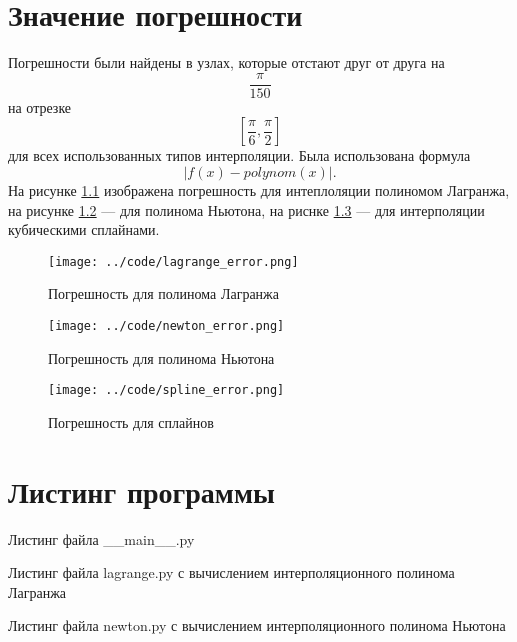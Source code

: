 \chapter{Значение погрешности}

Погрешности были найдены в узлах, которые отстают друг от друга на
$$ \frac{ \pi }{150}$$
на отрезке
$$ \left[ \frac{ \pi }{6}, \frac{ \pi }{2} \right] $$
для всех использованных типов интерполяции.
Была использована формула
$$ \left| f \left( x \right) - polynom \left( x \right) \right|.$$
На рисунке \ref{fig:lerror} изображена погрешность для интеплоляции полиномом Лагранжа,
на рисунке \ref{fig:nerror} --- для полинома Ньютона, на риснке \ref{fig:serror} ---
для интерполяции кубическими сплайнами.

\begin{figure}[h!]
  \centering
  \texttt{[image: ../code/lagrange\_error.png]}
  \caption{Погрешность для полинома Лагранжа}
  \label{fig:lerror}
\end{figure}

\begin{figure}[h!]
  \centering
  \texttt{[image: ../code/newton\_error.png]}
  \caption{Погрешность для полинома Ньютона}
  \label{fig:nerror}
\end{figure}

\begin{figure}[h!]
  \centering
  \texttt{[image: ../code/spline\_error.png]}
  \caption{Погрешность для сплайнов}
  \label{fig:serror}
\end{figure}

\chapter{Листинг программы}

Листинг файла \_\_main\_\_.py
\lstset{inputencoding=utf8, extendedchars=\true}


Листинг файла lagrange.py с вычислением интерполяционного полинома Лагранжа
\lstset{inputencoding=utf8, extendedchars=\true}



Листинг файла newton.py с вычислением интерполяционного полинома Ньютона
\lstset{inputencoding=utf8, extendedchars=\true}


